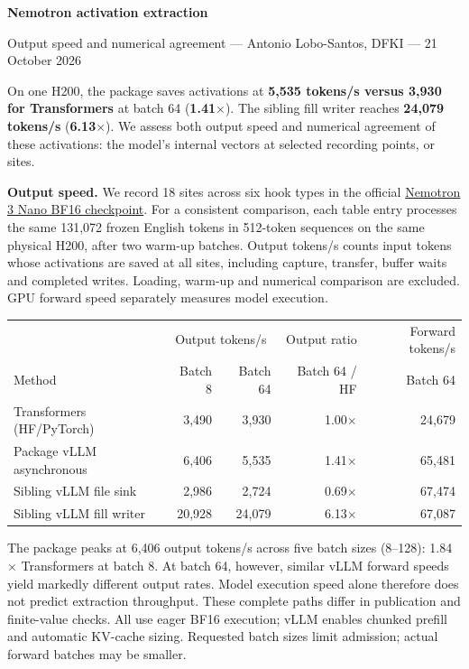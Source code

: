 \documentclass[10pt,a4paper]{article}
\begin{document}
\begin{center}
{\Large\bfseries Nemotron activation extraction}\par\vspace{2pt}
{\small Output speed and numerical agreement --- Antonio Lobo-Santos, DFKI --- 21 October 2026}
\end{center}

On one H200, the package saves activations at \textbf{5,535 tokens/s versus 3,930 for Transformers} at batch 64 (\textbf{1.41$\times$}). The sibling fill writer reaches \textbf{24,079 tokens/s} (\textbf{6.13$\times$}). We assess both output speed and numerical agreement of these activations: the model's internal vectors at selected recording points, or sites.

\textbf{Output speed.} We record 18 sites across six hook types in the official \href{https://huggingface.co/nvidia/NVIDIA-Nemotron-3-Nano-30B-A3B-BF16}{Nemotron 3 Nano BF16 checkpoint}. For a consistent comparison, each table entry processes the same 131,072 frozen English tokens in 512-token sequences on the same physical H200, after two warm-up batches. Output tokens/s counts input tokens whose activations are saved at all sites, including capture, transfer, buffer waits and completed writes. Loading, warm-up and numerical comparison are excluded. GPU forward speed separately measures model execution.
\begin{center}
\small
\begin{tabular}{lrrrr}
\toprule
 & \multicolumn{2}{c}{Output tokens/s} & Output ratio & Forward tokens/s\\
Method & Batch 8 & Batch 64 & Batch 64 / HF & Batch 64\\
\midrule
Transformers (HF/PyTorch) & 3,490 & 3,930 & 1.00$\times$ & 24,679\\
Package vLLM asynchronous & 6,406 & 5,535 & 1.41$\times$ & 65,481\\
Sibling vLLM file sink & 2,986 & 2,724 & 0.69$\times$ & 67,474\\
Sibling vLLM fill writer & 20,928 & 24,079 & 6.13$\times$ & 67,087\\
\bottomrule
\end{tabular}
\end{center}
The package peaks at 6,406 output tokens/s across five batch sizes (8--128): 1.84$\times$ Transformers at batch 8. At batch 64, however, similar vLLM forward speeds yield markedly different output rates. Model execution speed alone therefore does not predict extraction throughput. These complete paths differ in publication and finite-value checks. All use eager BF16 execution; vLLM enables chunked prefill and automatic KV-cache sizing. Requested batch sizes limit admission; actual forward batches may be smaller.
\end{document}
